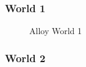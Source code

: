
\subsubsection{World 1}

\begin{figure} 

\begin{center}

\caption{Alloy World 1} 
\label{fig:alloyworld1} 


\end{center}
\end{figure} 

\clearpage
\subsubsection{World 2}

